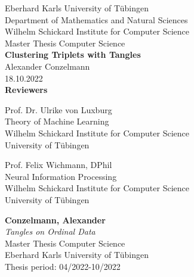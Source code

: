 \documentclass[twoside,12pt,a4paper]{report}
\begin{document}
 
\begin{titlepage}
 \begin{center}
  {\LARGE Eberhard Karls University of T\"ubingen}\\
  {\large Department of Mathematics and Natural Sciences \\
Wilhelm Schickard Institute for Computer Science\\[4cm]}
  {\huge Master Thesis Computer Science\\[2cm]}
  {\Large\bf  Clustering Triplets with Tangles \\[1.5cm]}
 {\large Alexander Conzelmann}\\[0.5cm]
18.10.2022\\[4cm]
{\small\bf Reviewers}\\[0.5cm]
  \parbox{7cm}{\begin{center}{\large Prof. Dr. Ulrike von Luxburg}\\
   Theory of Machine Learning\\
  {\footnotesize Wilhelm Schickard Institute for Computer Science\\
	University of T\"ubingen}\end{center}}\hfill\parbox{7cm}{\begin{center}
  {\large Prof. Felix Wichmann, DPhil}\\
  Neural Information Processing\\
  {\footnotesize Wilhelm Schickard Institute for Computer Science\\
	University of T\"ubingen}\end{center}
 }
  \end{center}
\end{titlepage}


\thispagestyle{empty}
\vspace*{\fill}
\begin{minipage}{11.2cm}
\textbf{Conzelmann, Alexander}\\
\emph{Tangles on Ordinal Data}\\ Master Thesis Computer Science\\
Eberhard Karls University of T\"ubingen\\
Thesis period: 04/2022-10/2022
\end{minipage}
\newpage
\end{document}
